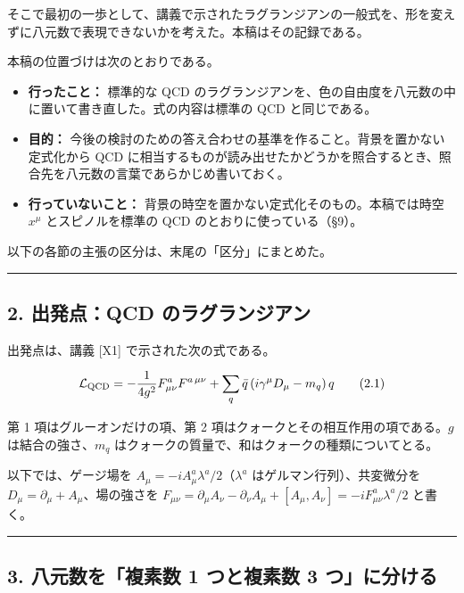 \documentclass[
  a4paper,
]{ltjsarticle}
\providecommand{\tightlist}{%
  \setlength{\itemsep}{0pt}\setlength{\parskip}{0pt}}
\begin{document}
そこで最初の一歩として、講義で示されたラグランジアンの一般式を、形を変えずに八元数で表現できないかを考えた。本稿はその記録である。

本稿の位置づけは次のとおりである。

\begin{itemize}
\tightlist
\item
  \textbf{行ったこと：} 標準的な QCD
  のラグランジアンを、色の自由度を八元数の中に置いて書き直した。式の内容は標準の
  QCD と同じである。
\item
  \textbf{目的：}
  今後の検討のための答え合わせの基準を作ること。背景を置かない定式化から
  QCD
  に相当するものが読み出せたかどうかを照合するとき、照合先を八元数の言葉であらかじめ書いておく。
\item
  \textbf{行っていないこと：}
  背景の時空を置かない定式化そのもの。本稿では時空 \(x^\mu\)
  とスピノルを標準の QCD のとおりに使っている（§9）。
\end{itemize}

以下の各節の主張の区分は、末尾の「区分」にまとめた。

\begin{center}\rule{0.5\linewidth}{0.5pt}\end{center}

\subsection{2. 出発点：QCD
のラグランジアン}\label{ux51faux767aux70b9qcd-ux306eux30e9ux30b0ux30e9ux30f3ux30b8ux30a2ux30f3}

出発点は、講義 {[}X1{]} で示された次の式である。

\[
\mathcal{L}_{\rm QCD} = -\frac{1}{4g^2}F^a_{\mu\nu}F^{a\,\mu\nu} + \sum_q \bar q\,(i\gamma^\mu D_\mu - m_q)\,q \tag{2.1}
\]

第 1 項はグルーオンだけの項、第 2
項はクォークとその相互作用の項である。\(g\) は結合の強さ、\(m_q\)
はクォークの質量で、和はクォークの種類についてとる。

以下では、ゲージ場を \(A_\mu = -iA^a_\mu\lambda^a/2\)（\(\lambda^a\)
はゲルマン行列）、共変微分を
\(D_\mu = \partial_\mu + A_\mu\)、場の強さを
\(F_{\mu\nu} = \partial_\mu A_\nu - \partial_\nu A_\mu + [A_\mu, A_\nu] = -iF^a_{\mu\nu}\lambda^a/2\)
と書く。

\begin{center}\rule{0.5\linewidth}{0.5pt}\end{center}

\subsection{3. 八元数を「複素数 1 つと複素数 3
つ」に分ける}\label{ux516bux5143ux6570ux3092ux8907ux7d20ux6570-1-ux3064ux3068ux8907ux7d20ux6570-3-ux3064ux306bux5206ux3051ux308b}
\end{document}
